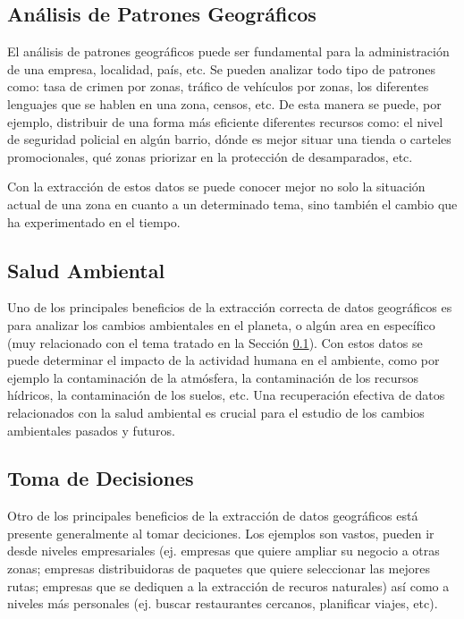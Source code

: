 \documentclass{llncs}
\begin{document}
\subsection{Análisis de Patrones Geográficos}\label{sec:patr}

El análisis de patrones geográficos puede ser fundamental para la administración
de una empresa, localidad, país, etc. Se pueden analizar todo tipo de patrones
como: tasa de crimen por zonas, tráfico de vehículos por zonas, los diferentes
lenguajes que se hablen en una zona, censos, etc. De esta manera se puede, por ejemplo,
distribuir de una forma más eficiente diferentes recursos como: el nivel de seguridad
policial en algún barrio, dónde es mejor situar una tienda o carteles promocionales,
qué zonas priorizar en la protección de desamparados, etc.

Con la extracción de estos datos se puede conocer mejor no solo la situación
actual de una zona en cuanto a un determinado tema, sino también el cambio que
ha experimentado en el tiempo.

\subsection{Salud Ambiental}\label{sec:pros}

Uno de los principales beneficios de la extracción correcta de datos
geográficos es para analizar los cambios ambientales \cite{scholten1991} en el
planeta, o algún area en específico (muy relacionado con el tema tratado en la
Sección \ref{sec:patr}). Con estos datos se puede determinar el impacto de la
actividad humana en el ambiente, como por ejemplo la contaminación de la
atmósfera, la contaminación de los recursos hídricos, la contaminación de los
suelos, etc. Una recuperación efectiva de datos relacionados con la salud
ambiental es crucial para el estudio de los cambios ambientales pasados y
futuros.

\subsection{Toma de Decisiones}\label{sec:deci}

Otro de los principales beneficios de la extracción de datos geográficos está
presente generalmente al tomar deciciones. Los ejemplos son vastos, pueden ir
desde niveles empresariales (ej. empresas que quiere ampliar su negocio a otras
zonas; empresas distribuidoras de paquetes que quiere seleccionar las mejores
rutas; empresas que se dediquen a la extracción de recuros naturales) así como
a niveles más personales (ej. buscar restaurantes cercanos, planificar viajes, etc).
\end{document}
